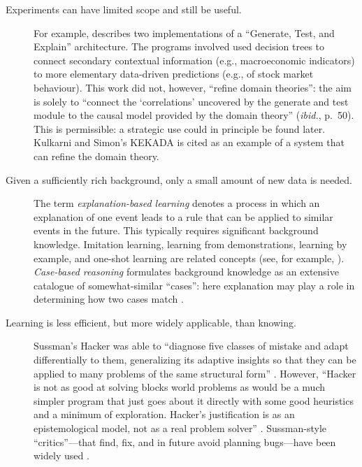\begin{description}                      
\item[Experiments can have limited scope and still be useful.]  For
  example, \citet{delamaza1994generate} describes two implementations
  of a ``Generate, Test, and Explain'' architecture.  The programs
  involved used decision trees to connect secondary contextual
  information (e.g., macroeconomic indicators) to more elementary
  data-driven predictions (e.g., of stock market behaviour).  This
  work did not, however, ``refine domain theories'': the aim is solely
  to ``connect the `correlations' uncovered by the generate and test
  module to the causal model provided by the domain theory''
  (\emph{ibid.}, p.~50).  This is permissible: a strategic use could in principle be
  found later.
  Kulkarni and Simon's \cite{kulkarni1988processes} {\sf
    KEKADA} is cited as an example of a system that can
  refine the domain theory.
\item[Given a sufficiently rich background, only a small amount of new data is needed.]
  The term \emph{explanation-based learning}
  \cite{ellman1989explanation,cohen1992abductive} denotes a process in
  which an explanation of one event leads to a rule that can be
  applied to similar events in the future.  This typically requires
  significant background knowledge.  Imitation learning, learning from
  demonstrations, learning by example, and one-shot learning are
  related concepts (see, for example, \cite{cypher1993watch}).
  \emph{Case-based reasoning} formulates background knowledge as an
  extensive catalogue of somewhat-similar ``cases'': here explanation
  may play a role in determining how two cases match
  \cite[p.~11]{aamodt1994case}.
\item[Learning is less efficient, but more widely applicable, than knowing.]
  Sussman's \cite{sussman1973computational} {\sf Hacker} was
  able to ``diagnose five classes of mistake and adapt differentially
  to them, generalizing its adaptive insights so that they can be
  applied to many problems of the same structural form''
  \cite{boden1984failure}.  However, ``Hacker is not as good at
  solving blocks world problems as would be a much simpler program
  that just goes about it directly with some good heuristics and a
  minimum of exploration.  Hacker's justification is as an
  epistemological model, not as a real problem solver''
  \cite{levin1975bateson}.  Sussman-style ``critics''---that find,
  fix, and in future avoid planning bugs---have been widely used
  \cite{Sacerdoti:1975:SPB:907010,Young1994,erol1995critical,singh2005alternate,kaelbling2011hierarchical}.

\end{description}
